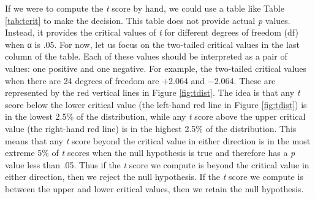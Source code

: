 \documentclass[
]{krantz}
\begin{document}
If we were to compute the \emph{t} score by hand, we could use a table like Table \ref{tab:tcrit} to make the decision. This table does not provide actual \emph{p} values. Instead, it provides the critical values of \emph{t} for different degrees of freedom (df) when α is .05. For now, let us focus on the two-tailed critical values in the last column of the table. Each of these values should be interpreted as a pair of values: one positive and one negative. For example, the two-tailed critical values when there are 24 degrees of freedom are +2.064 and −2.064. These are represented by the red vertical lines in Figure \ref{fig:tdist}. The idea is that any \emph{t} score below the lower critical value (the left-hand red line in Figure \ref{fig:tdist}) is in the lowest 2.5\% of the distribution, while any \emph{t} score above the upper critical value (the right-hand red line) is in the highest 2.5\% of the distribution. This means that any \emph{t} score beyond the critical value in either direction is in the most extreme 5\% of \emph{t} scores when the null hypothesis is true and therefore has a \emph{p} value less than .05. Thus if the \emph{t} score we compute is beyond the critical value in either direction, then we reject the null hypothesis. If the \emph{t} score we compute is between the upper and lower critical values, then we retain the null hypothesis.
\end{document}
